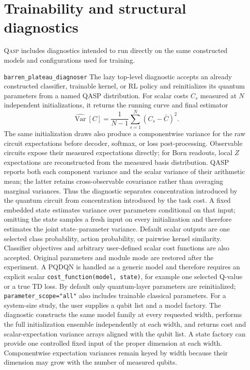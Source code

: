 \documentclass[10pt]{article}
\newcommand{\qasp}{\textsc{Qasp}}
\newcommand{\code}[1]{\texttt{#1}}
\begin{document}
\section{Trainability and structural diagnostics}
\label{sec:diagnostics}

\qasp{} includes diagnostics intended to run directly on the same constructed
models and configurations used for training.

\begin{qaspfeature}{\code{barren\_plateau\_diagnoser}}
The lazy top-level diagnostic accepts an already constructed classifier,
trainable kernel, or RL policy and reinitializes its quantum parameters from a
named QASP distribution.  For scalar costs $C_s$ measured at $N$ independent
initializations, it returns the running curve and final estimator
\begin{equation}
  \widehat{\operatorname{Var}}[C]
  = \frac{1}{N-1}\sum_{s=1}^{N}(C_s-\bar C)^2.
  \label{eq:model-cost-concentration}
\end{equation}
The same initialization draws also produce a componentwise variance for the
raw circuit expectations before decoder, softmax, or loss post-processing.
Observable circuits expose their measured expectations directly; for Born
readouts, local $Z$ expectations are reconstructed from the measured basis
distribution.  QASP reports both each component variance and the scalar
variance of their arithmetic mean; the latter retains cross-observable
covariance rather than averaging marginal variances.  Thus the diagnostic
separates concentration introduced by the quantum circuit from concentration
introduced by the task cost.
A fixed embedded state estimates variance over parameters conditional on that
input; omitting the state samples a fresh input on every initialization and
therefore estimates the joint state--parameter variance.  Default scalar
outputs are one selected class probability, action probability, or pairwise
kernel similarity.  Classifier objectives and arbitrary user-defined scalar
cost functions are also accepted.  Original parameters and module mode are
restored after the experiment.  A PQDQN is handled as a generic model and
therefore requires an explicit scalar \code{cost\_function(model, state)}, for
example one selected Q-value or a true TD loss.  By default only quantum-layer
parameters are reinitialized; \code{parameter\_scope="all"} also includes
trainable classical parameters.
For a system-size study, the user supplies a qubit list and a model factory.
The diagnostic constructs the same model family at every requested width,
performs the full initialization ensemble independently at each width, and
returns cost and scalar-expectation variance arrays aligned with the qubit
list.  A state factory can provide one controlled fixed input of the proper
dimension at each width.  Componentwise expectation variances remain keyed by
width because their dimension may grow with the number of measured qubits.
\end{qaspfeature}
\end{document}
